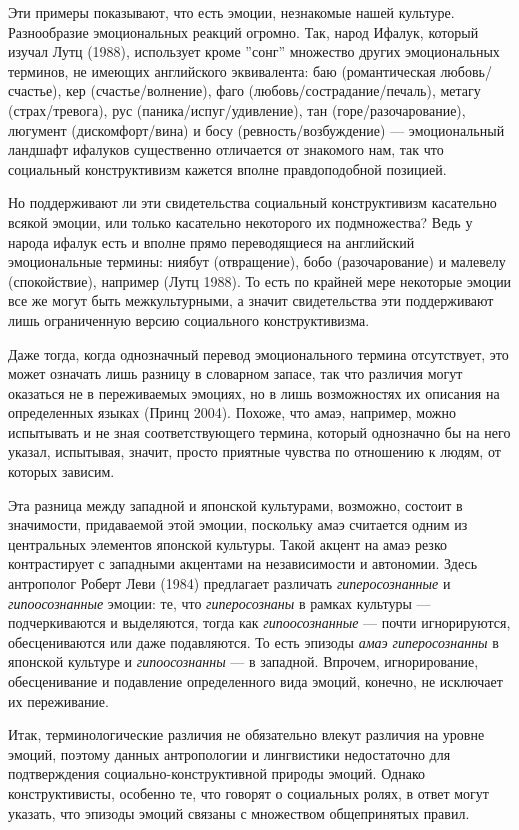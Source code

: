 \documentclass[11pt]{book}
\begin{document}
Эти примеры показывают, что есть эмоции, незнакомые нашей культуре. Разнообразие эмоциональных реакций огромно. Так, народ Ифалук, который изучал Лутц (1988), использует кроме ''сонг'' множество других эмоциональных терминов, не имеющих английского эквивалента: баю (романтическая любовь/счастье), кер (счастье/волнение), фаго (любовь/сострадание/печаль), метагу (страх/тревога), рус (паника/испуг/удивление), тан (горе/разочарование), люгумент (дискомфорт/вина) и босу (ревность/возбуждение) --- эмоциональный ландшафт ифалуков существенно отличается от знакомого нам, так что социальный конструктивизм кажется вполне правдоподобной позицией.

Но поддерживают ли эти свидетельства социальный конструктивизм касательно всякой эмоции, или только касательно некоторого их подмножества? Ведь у народа ифалук есть и вполне прямо переводящиеся на английский эмоциональные термины: ниябут (отвращение), бобо (разочарование) и малевелу (спокойствие), например (Лутц 1988). То есть по крайней мере некоторые эмоции все же могут быть межкультурными, а значит свидетельства эти поддерживают лишь ограниченную версию социального конструктивизма.

Даже тогда, когда однозначный перевод эмоционального термина отсутствует, это может означать лишь разницу в словарном запасе, так что различия могут оказаться не в переживаемых эмоциях, но в лишь возможностях их описания на определенных языках (Принц 2004). Похоже, что амаэ, например, можно испытывать и не зная соответствующего термина, который однозначно бы на него указал, испытывая, значит, просто приятные чувства по отношению к людям, от которых зависим.

Эта разница между западной и японской культурами, возможно, состоит в значимости, придаваемой этой эмоции, поскольку амаэ считается одним из центральных элементов японской культуры. Такой акцент на амаэ резко контрастирует с западными акцентами на независимости и автономии. Здесь антрополог Роберт Леви (1984) предлагает различать \textit{гиперосознанные} и \textit{гипоосознанные} эмоции: те, что \textit{гиперосознаны} в рамках культуры --- подчеркиваются и выделяются, тогда как \textit{гипоосознанные} --- почти игнорируются, обесцениваются или даже подавляются. То есть эпизоды \textit{амаэ} \textit{гиперосознанны} в японской культуре и \textit{гипоосознанны} --- в западной. Впрочем, игнорирование, обесценивание и подавление определенного вида эмоций, конечно, не исключает их переживание.

Итак, терминологические различия не обязательно влекут различия на уровне эмоций, поэтому данных антропологии и лингвистики недостаточно для подтверждения социально-конструктивной природы эмоций. Однако конструктивисты, особенно те, что говорят о социальных ролях, в ответ могут указать, что эпизоды эмоций связаны с множеством общепринятых правил.
\end{document}
